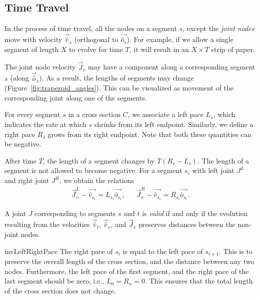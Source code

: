 \subsection{Time Travel}
\label{sec:time_travel}

In the process of time travel, all the nodes on a segment $s$, except the
\emph{joint nodes} move with velocity $\vec{\hat v}_s$ (orthogonal to $\vec{\hat
o_s}$). For example, if we allow a single segment of length $X$ to evolve for
time $T$, it will result in an $X\times T$ strip of paper.

The joint node velocity $\vec J_v$ may have a component along a corresponding
segment $s$ (along $\vec{\hat o}_s$). As a result, the lengths of segments may
change (Figure~\ref{fig:trapezoid_angles}). This can be visualized as movement
of the corresponding joint along one of the segments.

\begin{definition}
\label{def:segment_length}
For every segment $s$ in a cross section $C$, we associate a left pace $L_s$,
which indicates the rate at which $s$ shrinks from its left endpoint.
Similarly, we define a right pace $R_s$ grows from its right endpoint.
Note that both these quantities can be negative.
\end{definition}
After time $T$, the length of a segment changes by $T(R_s-L_s)$.
The length of a segment is not allowed to become negative.
For a segment $s_i$ with left joint $J^L$ and right joint $J^R$, we obtain the relations
\begin{align*}
\vec J_v^L-\vec{\hat v_{s_i}} = L_{s_i} \vec{\hat o_{s_i}}, && \vec J_v^R-\vec{\hat v_{s_i}} = R_{s_i} \vec{\hat o_{s_i}}.
\end{align*}

\begin{definition}
\label{def:valid_joint}
A joint $J$ corresponding to segments $s$ and $t$ is \emph{valid} if and only if the evolution
resulting from the velocities $\vec{\hat v}_l$, $\vec{\hat v}_r$, and $\vec J_v$ preserves distances between the non-joint nodes.
\end{definition}
\vspace{-1pc}
\begin{restatable}{inv}{LeftRightPace}
\label{inv:left_right_pace}
The right pace of $s_{i}$ is equal to the left pace of $s_{i+1}$.
This is to preserve the overall length of the cross section, and the distance between any two nodes.
Furthermore, the left pace of the first segment, and the right pace of the last segment should be zero, i.e., $L_0 = R_n = 0$.
This ensures that the total length of the cross section does not change.
\end{restatable}

